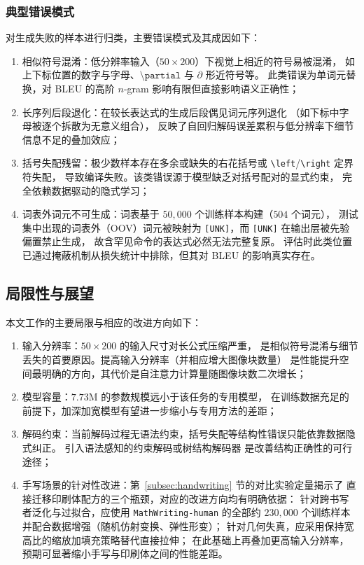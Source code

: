 \subsubsection{典型错误模式}
对生成失败的样本进行归类，主要错误模式及其成因如下：
\begin{enumerate}[label={（\arabic*）}, leftmargin=2em, labelsep=0.5em, itemsep=0pt]
    \item {相似符号混淆}：低分辨率输入（$50\times200$）下视觉上相近的符号易被混淆，
    如上下标位置的数字与字母、$\texttt{\textbackslash partial}$ 与 $\partial$ 形近符号等。
    此类错误为单词元替换，对 BLEU 的高阶 $n$-gram 影响有限但直接影响语义正确性；
    \item {长序列后段退化}：在较长表达式的生成后段偶见词元序列退化
    （如下标中字母被逐个拆散为无意义组合），
    反映了自回归解码误差累积与低分辨率下细节信息不足的叠加效应；
    \item {括号失配残留}：极少数样本存在多余或缺失的右花括号或
    \texttt{\textbackslash left}/\texttt{\textbackslash right} 定界符失配，
    导致编译失败。该类错误源于模型缺乏对括号配对的显式约束，
    完全依赖数据驱动的隐式学习；
    \item {词表外词元不可生成}：词表基于 $50{,}000$ 个训练样本构建（$504$ 个词元），
    测试集中出现的词表外（OOV）词元被映射为 \texttt{[UNK]}，而 \texttt{[UNK]} 在输出层被先验偏置禁止生成，
    故含罕见命令的表达式必然无法完整复原。
    评估时此类位置已通过掩蔽机制从损失统计中排除，但其对 BLEU 的影响真实存在。
\end{enumerate}

\subsection{局限性与展望}
\label{subsec:limitations}
本文工作的主要局限与相应的改进方向如下：
\begin{enumerate}[label={（\arabic*）}, leftmargin=2em, labelsep=0.5em, itemsep=0pt]
    \item {输入分辨率}：$50\times200$ 的输入尺寸对长公式压缩严重，
    是相似符号混淆与细节丢失的首要原因。提高输入分辨率（并相应增大图像块数量）
    是性能提升空间最明确的方向，其代价是自注意力计算量随图像块数二次增长；
    \item {模型容量}：$7.73$M 的参数规模远小于该任务的专用模型，
    在训练数据充足的前提下，加深加宽模型有望进一步缩小与专用方法的差距；
    \item {解码约束}：当前解码过程无语法约束，括号失配等结构性错误只能依靠数据隐式纠正。
    引入语法感知的约束解码或树结构解码器\supercite{zhuTAMERTreeawareTransformer2024}
    是改善结构正确性的可行途径；
    \item {手写场景的针对性改进}：第~\ref{subsec:handwriting} 节的对比实验定量揭示了
    直接迁移印刷体配方的三个瓶颈，对应的改进方向均有明确依据：
    针对跨书写者泛化与过拟合，应使用 \texttt{MathWriting-human} 的全部约 $230{,}000$
    个训练样本并配合数据增强（随机仿射变换、弹性形变）；
    针对几何失真，应采用保持宽高比的缩放加填充策略替代直接拉伸；
    在此基础上再叠加更高输入分辨率，预期可显著缩小手写与印刷体之间的性能差距。
\end{enumerate}


